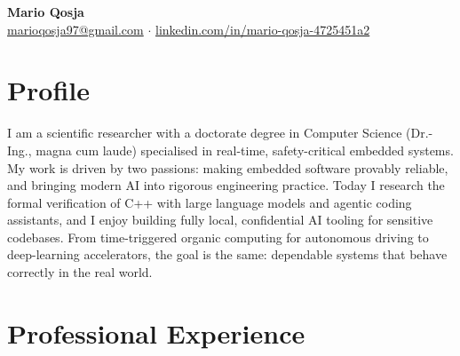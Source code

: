 \documentclass[10pt,a4paper]{article}
\begin{document}
\begin{center}
  {\Huge\bfseries Mario Qosja}\\[4pt]
  \href{mailto:marioqosja97@gmail.com}{marioqosja97@gmail.com}
  \quad$\cdot$\quad
  \href{https://de.linkedin.com/in/mario-qosja-4725451a2}{linkedin.com/in/mario-qosja-4725451a2}
\end{center}

\section{Profile}
I am a scientific researcher with a doctorate degree in Computer Science (Dr.-Ing., magna cum laude) specialised in real-time, safety-critical embedded systems. My work is driven by two passions: making embedded software provably reliable, and bringing modern AI into rigorous engineering practice. Today I research the formal verification of C++ with large language models and agentic coding assistants, and I enjoy building fully local, confidential AI tooling for sensitive codebases. From time-triggered organic computing for autonomous driving to deep-learning accelerators, the goal is the same: dependable systems that behave correctly in the real world. 
\section{Professional Experience}
\end{document}

